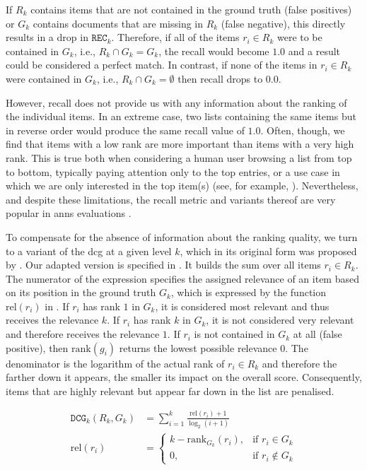 If $R_k$ contains items that are not contained in the ground truth (false positives) or $G_k$ contains documents that are missing in $R_k$ (false negative), this directly results in a drop in $\texttt{REC}_k$. Therefore, if all of the items $r_i \in R_k$ were to be contained in $G_k$, i.e., $R_k \cap G_k = G_k$, the recall would become $1.0$ and a result could be considered a perfect match. In contrast, if none of the items in $r_i \in R_k$ were contained in $G_k$, i.e., $R_k \cap G_k = \emptyset$ then recall drops to $0.0$. 

However, recall does not provide us with any information about the ranking of the individual items. In an extreme case, two lists containing the same items but in reverse order would produce the same recall value of $1.0$. Often, though, we find that items with a low rank are more important than items with a very high rank. This is true both when considering a human user browsing a list from top to bottom, typically paying attention only to the top entries, or a use case in which we are only interested in the top item(s) (see, for example, ). Nevertheless, and despite these limitations, the recall metric and variants thereof are very popular in \acrshort{anns} evaluations \cite{Aumueller:2017ANN,Simhadri:2022Results}. 

To compensate for the absence of information about the ranking quality, we turn to a variant of the \acrshort{dcg} at a given level $k$, which in its original form was proposed by \cite{Jarvelin:2002Cumulated}. Our adapted version is specified in . It builds the sum over all items $r_i \in R_k$. The numerator of the expression specifies the assigned relevance of an item based on its position in the ground truth $G_k$, which is expressed by the function $\text{rel} (r_i)$ in . If $r_i$ has rank $1$ in $G_k$, it is considered most relevant and thus receives the relevance $k$. If $r_i$ has rank $k$ in $G_k$, it is not considered very relevant and therefore receives the relevance $1$. If $r_i$ is not contained in $G_k$ at all (false positive), then $\text{rank} (g_i)$ returns the lowest possible relevance $0$. The denominator is the logarithm of the actual rank of $r_i \in R_k$ and therefore the farther down it appears, the smaller its impact on the overall score. Consequently, items that are highly relevant but appear far down in the list are penalised.

\begin{align}
\label{equation:dcg}
\mathtt{DCG}_k (R_k, G_k) &= \sum_{i = 1}^{k} \frac{\text{rel}(r_i) + 1}{\log_2(i + 1)} \\
\label{equation:dcg_rel}
\text{rel} (r_i) &= 
    \begin{cases}
        k - \text{rank}_{G_k}(r_i), &  \text{if } r_i \in G_k \\
        0,                          &  \text{if } r_i \notin G_k
    \end{cases}
\end{align}

